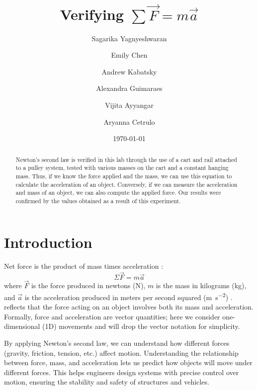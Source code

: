 \documentclass[reprint,amsmath,amssymb,aps]{revtex4-2}
\begin{document}
\title{Verifying $\sum\vec{F} = m\vec{a}$}

\author{Sagarika Yagnyeshwaran}
\author{Emily Chen}
\author{Andrew Kabatsky}
\author{Alexandra Guimaraes}
\author{Vijita Ayyangar}
\author{Aryanna Cetrulo}
\date{\today}

\begin{abstract}
Newton’s second law is verified in this lab through the use of a cart and rail attached to a pulley system, tested with various masses on the cart and a constant hanging mass. Thus, if we know the force applied and the mass, we can use this equation to calculate the acceleration of an object. Conversely, if we can measure the acceleration and mass of an object, we can also compute the applied force. Our results were confirmed by the values obtained as a result of this experiment.
\end{abstract}


\maketitle





\section{Introduction}
Net force is the product of mass times acceleration \cite{newton1687principia}:
\begin{equation} 
\Sigma\vec{F} = m\vec{a}
\label{eq:1}
\end{equation}
where $\vec{F}$ is the force produced in newtons (\unit{\newton}), $m$ is the mass in kilograms (\unit{\kilo\gram}), and $\vec{a}$ is the acceleration produced in meters per second squared (\unit{\meter\per\second\squared}) \cite{newton1687principia}.  reflects that the force acting on an object involves both its mass and acceleration. Formally, force and acceleration are vector quantities; here we consider one-dimensional (1D) movements and will drop the vector notation for simplicity. 

By applying Newton's second law, we can understand how different forces (gravity, friction, tension, etc.) affect motion. Understanding the relationship between force, mass, and acceleration lets us predict how objects will move under different forces. This helps engineers design systems with precise control over motion, ensuring the stability and safety of structures and vehicles.
\end{document}
